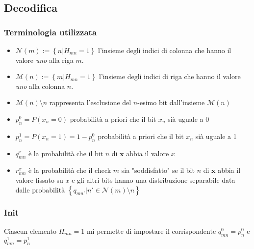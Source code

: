 \documentclass{article}
\begin{document}
	\subsection{Decodifica}
	\subsubsection{Terminologia utilizzata}
	\begin{itemize}
		\item $\mathcal{N}(m) := \left\{ n | H_{mn} = 1 \right\}$ l'insieme degli indici di colonna che hanno il valore \textit{uno} alla riga $m$.
		\item $\mathcal{M}(n) := \left\{ m | H_{mn} = 1 \right\}$ l'insieme degli indici di riga che hanno il valore \textit{uno} alla colonna $n$.
		\item $\mathcal{M}(n)\setminus n$ rappresenta l'esclusione del $n$-esimo bit dall'insieme $\mathcal{M}(n)$
		\item $p_n^0 = P(x_n=0)$ probabilità a priori che il bit $x_n$ sià uguale a 0
		\item $p_n^1 = P(x_n=1)=1-p_n^0$ probabilità a priori che il bit $x_n$ sià uguale a 1
		\item $q^x_{mn}$ è la probabilità che il bit $n$ di $\textbf{x}$ abbia il valore $x$
		\item $r^x_{mn}$ è la probabilità che il check $m$ sia "soddisfatto" se il bit $n$ di $\textbf{x}$ abbia il valore fissato su $x$ e gli altri bits hanno una distribuzione separabile data dalle probabilità $\left\{ q_{mn'} | n' \in \mathcal{N}(m)\setminus n\right\}$
	\end{itemize}
	\subsubsection{Init}
	Ciascun elemento $H_{mn} = 1$ mi permette di impostare il corrispondente $q^0_{mn} = p^0_n$ e $q^1_{mn} = p^1_n$
\end{document}
